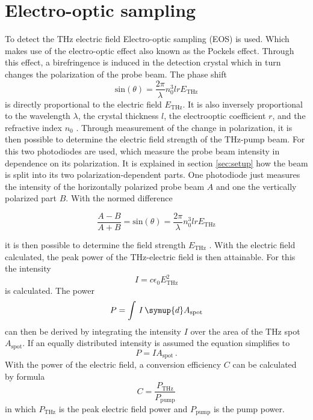\section{Electro-optic sampling}\label{sec:eos}
To detect the $\si{\tera\hertz}$ electric field Electro-optic sampling (EOS) is used.
Which makes use of the electro-optic effect also known as the Pockels effect.
Through this effect, a birefringence is induced in the detection crystal which in turn changes the polarization of the probe beam.
The phase shift 
\begin{equation}
    \text{sin}(\theta) = \frac{2\pi}{\lambda} n_0^3 l r E_\text{THz}
\end{equation}
is directly proportional to the electric field $E_\text{THz}$. 
It is also inversely proportional to the wavelength $\lambda$, the crystal thickness $l$, the electrooptic coefficient $r$, and the refractive index $n_0$ \cite{wiki_book}. 
Through measurement of the change in polarization, it is then possible to determine the electric field strength of the $\si{\tera\hertz}$-pump beam.
For this two photodiodes are used, which measure the probe beam intensity in dependence on its polarization.
It is explained in section \ref{sec:setup} how the beam is split into its two polarization-dependent parts.
One photodiode just measures the intensity of the horizontally polarized probe beam $A$ and one the vertically polarized part $B$.
With the normed difference 

\begin{equation}
    \frac{A-B}{A+B} = \text{sin}(\theta) = \frac{2\pi}{\lambda} n_0^3 l r E_\text{THz}
    \label{eq:electricfield_A_B}
\end{equation}

it is then possible to determine the field strength $E_\text{THz}$ \cite{THZ_eltric_field}.
With the electric field calculated, the peak power of the $\si{\tera\hertz}$-electric field is then attainable.
For this the intensity
\begin{equation}
    I = c \epsilon_0 E_\text{THz}^2
    \label{eq:intensity}
\end{equation}
is calculated.
The power 
\begin{equation}
    P = \int\, I \,\symup{d}A_\text{spot}
\end{equation}
can then be derived by integrating the intensity $I$ over the area of the $\si{\tera\hertz}$ spot $A_\text{spot}$.
If an equally distributed intensity is assumed the equation simplifies to 
\begin{equation}
    P = IA_\text{spot}\,.
    \label{eq:power}
\end{equation}
With the power of the electric field, a conversion efficiency $C$ can be calculated by formula
\begin{equation}
    C = \frac{P_\text{THz}}{P_\text{pump}}
    \label{eq:conversion}
\end{equation}
in which $P_\text{THz}$ is the peak electric field power and $P_\text{pump}$ is the pump power.


